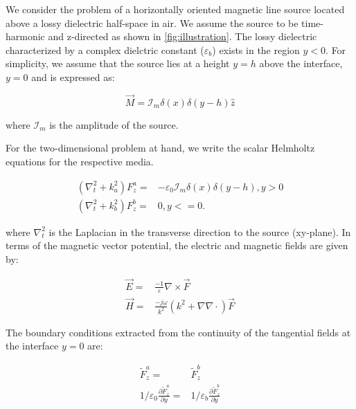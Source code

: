 \documentclass{article}
\begin{document}
  We consider the problem of a horizontally oriented magnetic line source located above a lossy dielectric half-space in air. We assume the source to be time-harmonic and z-directed as shown in \ref{fig:illustration}. The lossy dielectric characterized by a complex dielctric constant ($\varepsilon_b$) exists in the region $y < 0$. For simplicity, we assume that the source lies at a height $y = h$ above the interface, $y = 0$ and is expressed as:

  \begin{equation}
    \overrightarrow{M} = \mathcal{I}_m \delta(x) \delta(y -h) \widehat{z}
    \label{eq:Current}
  \end{equation}

  where $\mathcal{I}_m$ is the amplitude of the source.

  For the two-dimensional problem at hand, we write the scalar Helmholtz equations for the respective media.

  \begin{subequations}
    \begin{align}
      \left( \nabla_t^2 + k_a^2 \right) F_z^a ={}& -\varepsilon_0 \mathcal{I}_m  \delta(x) \delta(y - h), y > 0
      \label{eq:Hemup} \\
      \left( \nabla_t^2 + k_b^2 \right) F_z^b ={}& 0,     y <= 0
      \label{eq:Hemdn}.
    \end{align}
    \label{Hem}
  \end{subequations}

  where $\nabla_t^2$ is the Laplacian in the transverse direction to the source (xy-plane). In terms of the magnetic vector potential, the electric and magnetic fields are given by:

  \begin{subequations}
    \begin{align}
      \overrightarrow{E}  ={}& \frac{-1}{\varepsilon} \nabla \times \overrightarrow{F}
      \label{eq:E} \\
      \overrightarrow{H}  ={}& \frac{-j\omega}{k^2} \left( k^2 + \nabla \nabla \cdot \right) \overrightarrow{F}
      \label{eq:H}
    \end{align}
  \end{subequations}

  The boundary conditions extracted from the continuity of the tangential fields at the interface $y = 0$ are:

  \begin{subequations}
    \begin{align}
      \widetilde{F}_z^a ={}& \widetilde{F}_z^b
      \label{eq:HBC} \\
      1 /\varepsilon_0 \frac{\partial \widetilde{F}_z^a}{\partial y} ={}& 1 /\varepsilon_b\frac{\partial \widetilde{F}_z^b}{\partial y}
      \label{eq:EBC}
    \end{align}
    \label{eq:BC}
  \end{subequations}
\end{document}
